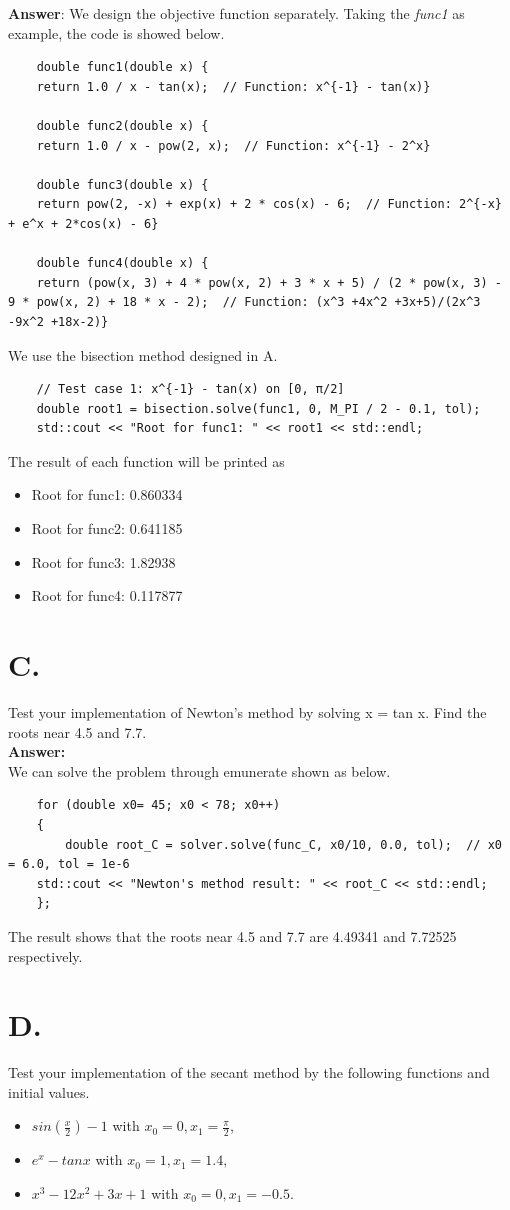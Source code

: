\documentclass{article}
\begin{document}
\begin{CJK}{UTF8}{gbsn}
\textbf{Answer}: 
We design the objective function separately. Taking the \textit{func1} as example, the code is showed below.
\begin{verbatim}
    double func1(double x) {
    return 1.0 / x - tan(x);  // Function: x^{-1} - tan(x)}
    
    double func2(double x) {
    return 1.0 / x - pow(2, x);  // Function: x^{-1} - 2^x}
    
    double func3(double x) {
    return pow(2, -x) + exp(x) + 2 * cos(x) - 6;  // Function: 2^{-x} + e^x + 2*cos(x) - 6}
    
    double func4(double x) {
    return (pow(x, 3) + 4 * pow(x, 2) + 3 * x + 5) / (2 * pow(x, 3) - 9 * pow(x, 2) + 18 * x - 2);  // Function: (x^3 +4x^2 +3x+5)/(2x^3 -9x^2 +18x-2)}
\end{verbatim}
We use the bisection method designed in A.
\begin{verbatim}
    // Test case 1: x^{-1} - tan(x) on [0, π/2]
    double root1 = bisection.solve(func1, 0, M_PI / 2 - 0.1, tol);
    std::cout << "Root for func1: " << root1 << std::endl;
\end{verbatim}
The result of each function will be printed as 
\begin{itemize}
    \item Root for func1: 0.860334
    \item Root for func2: 0.641185
    \item Root for func3: 1.82938
    \item Root for func4: 0.117877
\end{itemize}

\section*{C.}
Test your implementation of Newton’s method by solving x = tan x. Find the roots near 4.5 and 7.7.\\
\textbf{Answer: }\\
We can solve the problem through emunerate shown as below.
\begin{verbatim}
    for (double x0= 45; x0 < 78; x0++)
    {
        double root_C = solver.solve(func_C, x0/10, 0.0, tol);  // x0 = 6.0, tol = 1e-6
    std::cout << "Newton's method result: " << root_C << std::endl;
    };
\end{verbatim}
The result shows that the roots near 4.5 and 7.7 are 4.49341 and 7.72525 respectively.

\section*{D.}
Test your implementation of the secant method by the following functions and initial values.
\begin{itemize}
    \item $sin(\frac{x}{2}) - 1$ with $x_0 = 0, x_1 = \frac{\pi}{2}$,
    \item $e^x-tanx$ with $x_0 =1,x_1 =1.4,$
    \item $x^3-12x^2+3x+1$ with $x_0 =0,x_1 =-0.5.$
\end{itemize}



\end{CJK}
\end{document}

